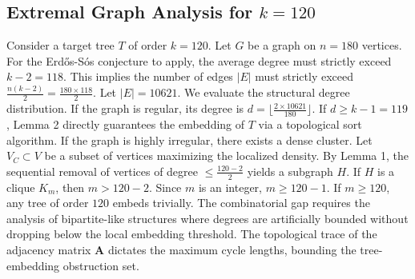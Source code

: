 \documentclass[11pt,a4paper]{article}
\begin{document}
\subsection{Extremal Graph Analysis for $k=120$}
Consider a target tree $T$ of order $k=120$.
Let $G$ be a graph on $n=180$ vertices.
For the Erd\H{o}s-S\'os conjecture to apply, the average degree must strictly exceed $k-2 = 118$.
This implies the number of edges $|E|$ must strictly exceed $\frac{n(k-2)}{2} = \frac{180 \times 118}{2}$.
Let $|E| = 10621$.
We evaluate the structural degree distribution. If the graph is regular, its degree is $d = \lfloor \frac{2 \times 10621}{180} \rfloor$.
If $d \geq k-1 = 119$, Lemma 2 directly guarantees the embedding of $T$ via a topological sort algorithm.
If the graph is highly irregular, there exists a dense cluster. Let $V_C \subset V$ be a subset of vertices maximizing the localized density.
By Lemma 1, the sequential removal of vertices of degree $\leq \frac{120-2}{2}$ yields a subgraph $H$.
If $H$ is a clique $K_{m}$, then $m > 120-2$. Since $m$ is an integer, $m \geq 120-1$. If $m \geq 120$, any tree of order $120$ embeds trivially.
The combinatorial gap requires the analysis of bipartite-like structures where degrees are artificially bounded without dropping below the local embedding threshold. The topological trace of the adjacency matrix $\mathbf{A}$ dictates the maximum cycle lengths, bounding the tree-embedding obstruction set.
\end{document}

